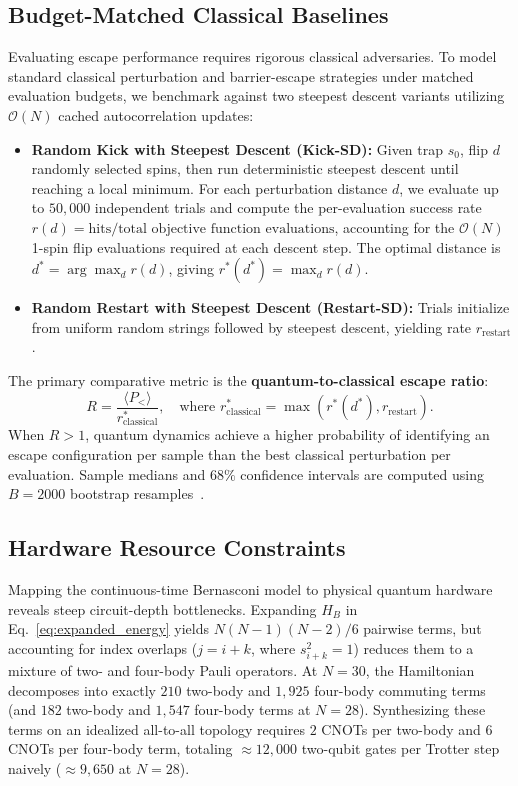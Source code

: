\documentclass[10pt,twocolumn,a4paper]{article}
\begin{document}
\subsection{Budget-Matched Classical Baselines}
Evaluating escape performance requires rigorous classical adversaries. To model standard classical perturbation and barrier-escape strategies under matched evaluation budgets, we benchmark against two steepest descent variants utilizing $\mathcal{O}(N)$ cached autocorrelation updates:
\begin{itemize}
    \item \textbf{Random Kick with Steepest Descent (Kick-SD):} Given trap $s_0$, flip $d$ randomly selected spins, then run deterministic steepest descent until reaching a local minimum. For each perturbation distance $d$, we evaluate up to $50{,}000$ independent trials and compute the per-evaluation success rate $r(d) = \text{hits} / \text{total objective function evaluations}$, accounting for the $\mathcal{O}(N)$ 1-spin flip evaluations required at each descent step. The optimal distance is $d^* = \arg\max_d r(d)$, giving $r^*(d^*) = \max_d r(d)$.
    \item \textbf{Random Restart with Steepest Descent (Restart-SD):} Trials initialize from uniform random strings followed by steepest descent, yielding rate $r_{\mathrm{restart}}$.
\end{itemize}

The primary comparative metric is the \textbf{quantum-to-classical escape ratio}:
\begin{equation}
    R = \frac{\langle P_< \rangle}{r_{\mathrm{classical}}^*}, \quad \text{where } r_{\mathrm{classical}}^* = \max(r^*(d^*), r_{\mathrm{restart}}).
    \label{eq:ratio_r}
\end{equation}
When $R > 1$, quantum dynamics achieve a higher probability of identifying an escape configuration per sample than the best classical perturbation per evaluation. Sample medians and $68\%$ confidence intervals are computed using $B = 2000$ bootstrap resamples~\cite{efron1994}.

\subsection{Hardware Resource Constraints}
Mapping the continuous-time Bernasconi model to physical quantum hardware reveals steep circuit-depth bottlenecks. Expanding $\hat{H}_B$ in Eq.~\eqref{eq:expanded_energy} yields $N(N-1)(N-2)/6$ pairwise terms, but accounting for index overlaps ($j = i+k$, where $s_{i+k}^2 = 1$) reduces them to a mixture of two- and four-body Pauli operators. At $N = 30$, the Hamiltonian decomposes into exactly $210$ two-body and $1{,}925$ four-body commuting terms (and $182$ two-body and $1{,}547$ four-body terms at $N = 28$). Synthesizing these terms on an idealized all-to-all topology requires $2$ CNOTs per two-body and $6$ CNOTs per four-body term, totaling $\approx 12{,}000$ two-qubit gates per Trotter step naively ($\approx 9{,}650$ at $N = 28$).
\end{document}
